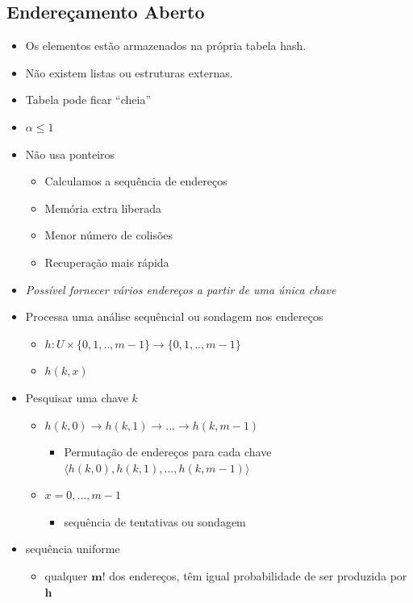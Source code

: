 \documentclass{beamer}
\begin{document}
\subsection{Endereçamento Aberto}
\begin{frame}
 \begin{itemize}
  \item Os elementos estão armazenados na própria tabela hash.
  \item Não existem listas ou estruturas externas.
  \item Tabela pode ficar ``cheia''  
  \item $\alpha \leq 1$
  \item Não usa ponteiros
  \begin{itemize}
   \item Calculamos a sequência de endereços
   \item Memória extra liberada
   \item Menor número de colisões
   \item Recuperação mais rápida
  \end{itemize}
 \end{itemize}
\end{frame}

\begin{frame}
 \begin{itemize}
  \item \emph{Possível fornecer vários endereços a partir de uma única chave}
  \item Processa uma análise sequêncial ou sondagem nos endereços
  \begin{itemize}
   \item $h: U \times \{0,1,..,m-1\} \rightarrow \{0,1,..,m-1\}$
   \item $h(k,x)$
  \end{itemize}
  \item Pesquisar uma chave $k$
  \begin{itemize}
   \item $h(k,0)\rightarrow h(k,1)\rightarrow ... \rightarrow h(k,m-1)$
   \begin{itemize}
    \item Permutação de endereços para cada chave $\langle h(k,0), h(k,1),...,h(k,m-1)\rangle$
   \end{itemize}
   \item $x=0,...,m-1$
   \begin{itemize}
    \item sequência de tentativas ou sondagem
   \end{itemize}
   
  \end{itemize}
\item sequência uniforme
\begin{itemize}
 \item qualquer $\mathbf{m!}$ dos endereços, têm igual probabilidade de ser produzida por $\mathbf{h}$
\end{itemize}

  \end{itemize}

\end{frame}
\end{document}
